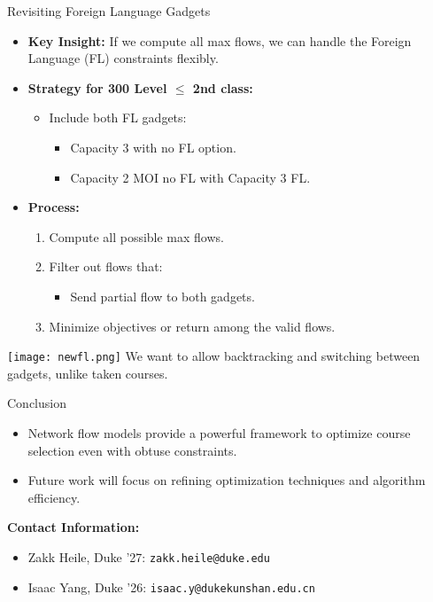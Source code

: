 \documentclass{beamer}
\begin{document}

\begin{frame}{Revisiting Foreign Language Gadgets}
    \begin{itemize}
        \item \textbf{Key Insight:} If we compute all max flows, we can handle the Foreign Language (FL) constraints flexibly.
        \item \textbf{Strategy for 300 Level \(\leq\) 2nd class:}
        \begin{itemize}
            \item Include both FL gadgets:
            \begin{itemize}
                \item Capacity 3 with no FL option.
                \item Capacity 2 MOI no FL with Capacity 3 FL.
            \end{itemize}
        \end{itemize}
        \item \textbf{Process:}
        \begin{enumerate}
            \item Compute all possible max flows.
            \item Filter out flows that:
            \begin{itemize}
                \item Send partial flow to both gadgets.
            \end{itemize}
            \item Minimize objectives or return among the valid flows.
        \end{enumerate}
    \end{itemize}
\end{frame}


\begin{frame}
    \centering
    \texttt{[image: newfl.png]}
    \tiny{We want to allow backtracking and switching between gadgets, unlike taken courses.}
\end{frame}

\begin{frame}{Conclusion}
    \begin{itemize}
        \item Network flow models provide a powerful framework to optimize course selection even with obtuse constraints.

        \item Future work will focus on refining optimization techniques and algorithm efficiency. 
    \end{itemize}
    \vspace{1cm}
    \textbf{Contact Information:}
    \begin{itemize}
        \item Zakk Heile, Duke '27: \texttt{zakk.heile@duke.edu}
        \item Isaac Yang, Duke '26: \texttt{isaac.y@dukekunshan.edu.cn}
    \end{itemize}
\end{frame}
\end{document}
